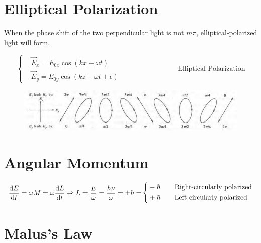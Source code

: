 \section{Elliptical Polarization}

When the phase shift of the two perpendicular light is not $m \pi$, elliptical-polarized light will form.

\begin{equation*}
  \left\{
    \begin{aligned}
      & \vec{E}_x = E_{0x} \cos \left( k x - \omega t \right) \\
      & \vec{E}_y = E_{0y} \cos \left( k z - \omega t + \epsilon \right)
    \end{aligned}
  \right.
  \quad\quad \quad\quad \quad\quad \quad\quad  \text{Elliptical Polarization}
\end{equation*}

\begin{figure}[H]
  \centering
  \includegraphics[width=\linewidth]{figures/elliptical-polarized.png}
\end{figure}

\section{Angular Momentum}

\begin{equation*}
  \begin{aligned}
    \dfrac{\mathop{}\!\mathrm{d} E}{\mathop{}\!\mathrm{d} t} = \omega M = \omega \dfrac{\mathop{}\!\mathrm{d} L}{\mathop{}\!\mathrm{d} t}  
  \end{aligned}
  \Rightarrow 
  \begin{aligned}
    L = \dfrac{E}{\omega} = \dfrac{h \nu}{\omega} = \pm \hbar = 
  \end{aligned}
  \left\{
    \begin{aligned}
      & - \hbar \quad\quad \text{Right-circularly polarized} \\
      & + \hbar \quad\quad \text{Left-circularly polarized}
    \end{aligned}
  \right.
\end{equation*}

\section{Malus's Law}

